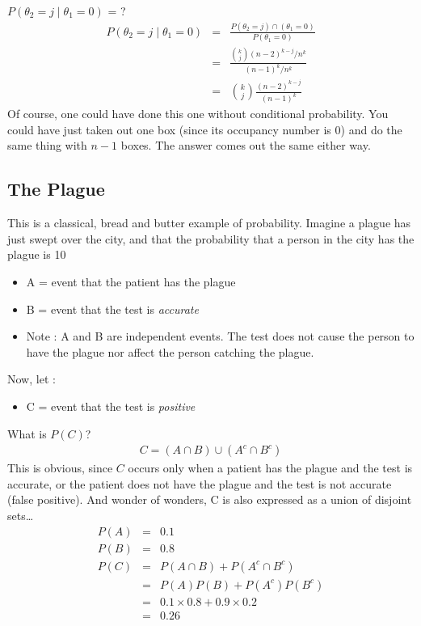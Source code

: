 $P(\theta_2 = j \mid \theta_1 = 0)$ = ?
\begin{eqnarray*}
P(\theta_2 = j \mid \theta_1 = 0) &=& \frac{P(\theta_2 = j) \cap (\theta_1 = 0)}{P(\theta_1 = 0)} \\
                                  &=& \frac{{k \choose j} (n-2)^{k-j} / n^{k}}{(n-1)^{k} / n^{k}} \\
                                  &=& {k \choose j} \frac{(n-2)^{k-j}}{(n-1)^{k}}
\end{eqnarray*}
Of course, one could have done this one without conditional probability.  You could have just taken out one box (since its occupancy number is 0) and do the same thing with $n-1$ boxes.  The answer comes out the same either way.
\subsection{The Plague}
This is a classical, bread and butter example of probability.  Imagine a plague has just swept over the city, and that the probability that a person in the city has the plague is 10%
\begin{itemize}
\item[] A = event that the patient has the plague
\item[] B = event that the test is \em accurate
\item[] Note : A and B are independent events.  The test does not cause the person to have the plague nor affect the person catching the plague.
\end{itemize}
Now, let : 
\begin{itemize}
\item[] C = event that the test is \em positive \em
\end{itemize}
What is $P(C)$?
\begin{eqnarray*}
C = (A \cap B) \cup (A^{c} \cap B^{c})
\end{eqnarray*}
This is obvious, since $C$ occurs only when a patient has the plague and the test is accurate, or the patient does not have the plague and the test is not accurate (false positive).  And wonder of wonders, C is also expressed as a union of disjoint sets\ldots
\begin{eqnarray*}
P(A) &=& 0.1\\
P(B) &=& 0.8\\
P(C) &=& P(A \cap B) + P(A^{c} \cap B^{c}) \\
     &=& P(A)P(B) + P(A^{c})P(B^{c}) \\
     &=& 0.1 \times 0.8 + 0.9 \times 0.2 \\
     &=& 0.26
\end{eqnarray*}
